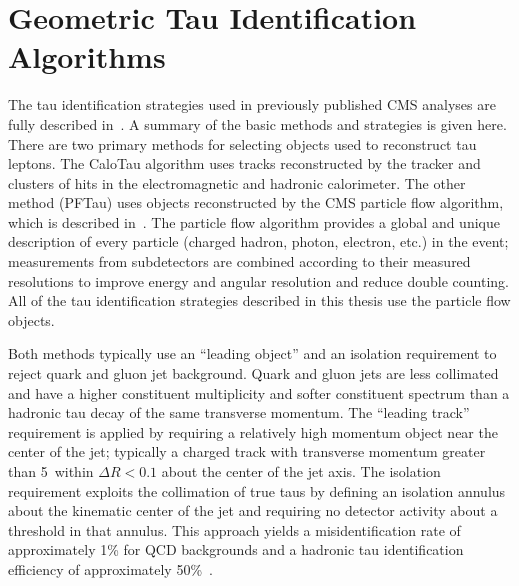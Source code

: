 \section{Geometric Tau Identification Algorithms}
\label{sec:GeometricTauId}
%
The tau identification strategies used in previously published CMS analyses are
fully described in~\cite{CMS-PAS-PFT-08-001}.  A summary of the basic methods
and strategies is given here. There are two primary methods for selecting
objects used to reconstruct tau leptons.  The CaloTau algorithm uses tracks
reconstructed by the tracker and clusters of hits in the electromagnetic and
hadronic calorimeter.  The other method (PFTau) uses objects reconstructed by
the CMS particle flow algorithm, which is described
in~\cite{CMS-PAS-PFT-09-001}.  The particle flow algorithm provides a global and
unique description of every particle (charged hadron, photon, electron, etc.) in
the event; measurements from subdetectors are combined according to their
measured resolutions to improve energy and angular resolution and reduce double
counting.  All of the tau identification strategies described in this thesis use
the particle flow objects.

Both methods typically use an ``leading object'' and an isolation requirement to
reject quark and gluon jet background.  Quark and gluon jets are less collimated
and have a higher constituent multiplicity and softer constituent \pt spectrum
than a hadronic tau decay of the same transverse momentum.  The ``leading
track'' requirement is applied by requiring a relatively high momentum object
near the center of the jet; typically a charged track with transverse momentum
greater than 5~\GeVc within $\Delta R < 0.1$ about the center of the jet axis.
The isolation requirement exploits the collimation of true taus by defining an
isolation annulus about the kinematic center of the jet and requiring no
detector activity about a threshold in that annulus.  This approach yields a
misidentification rate of approximately 1\% for QCD backgrounds and a hadronic
tau identification efficiency of approximately 50\%~\cite{CMS-PAS-PFT-08-001}.

